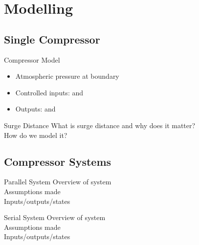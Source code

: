 \section{Modelling}

\subsection{Single Compressor}
\begin{frame}{Compressor Model}
  \begin{minipage}{0.6\linewidth}
    \resizebox{\linewidth}{!}{
      \begin{tikzpicture}
        \drawcomp
      \end{tikzpicture}
    }
  \end{minipage}
  \begin{minipage}{0.38\linewidth}
  \begin{itemize}
    \item Atmospheric pressure at boundary
    \item Controlled inputs:  and 
    \item Outputs:  and 
  \end{itemize}
\end{minipage}
\end{frame}

\begin{frame}{Surge Distance}
  What is surge distance and why does it matter?\\
  How do we model it?\\
\end{frame}

\subsection{Compressor Systems}

\begin{frame}{Parallel System}
  Overview of system\\
  Assumptions made\\
  Inputs/outputs/states
\end{frame}

\begin{frame}{Serial System}
  Overview of system\\
  Assumptions made\\
  Inputs/outputs/states
\end{frame}

